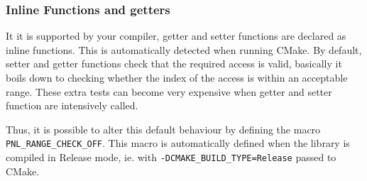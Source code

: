 \documentclass[a4paper,11pt,twoside]{article}
\begin{document}
\subsubsection{Inline Functions and getters}
\label{sec:inline}

It it is supported by your compiler, getter and setter functions are declared
as inline functions. This is automatically detected when running CMake. By
default, setter and getter functions check that the required access is valid,
basically it boils down to checking whether the index of the access is within an
acceptable range. These extra tests can become very expensive when getter and
setter function are intensively called. 

Thus,  it is possible to alter this default behaviour by defining the macro
\texttt{PNL_RANGE_CHECK_OFF}. This macro is automatically defined when the
library is compiled in Release mode, ie. with \verb!-DCMAKE_BUILD_TYPE=Release!
passed to CMake.























\clearpage
{}
\printindex
\end{document}
